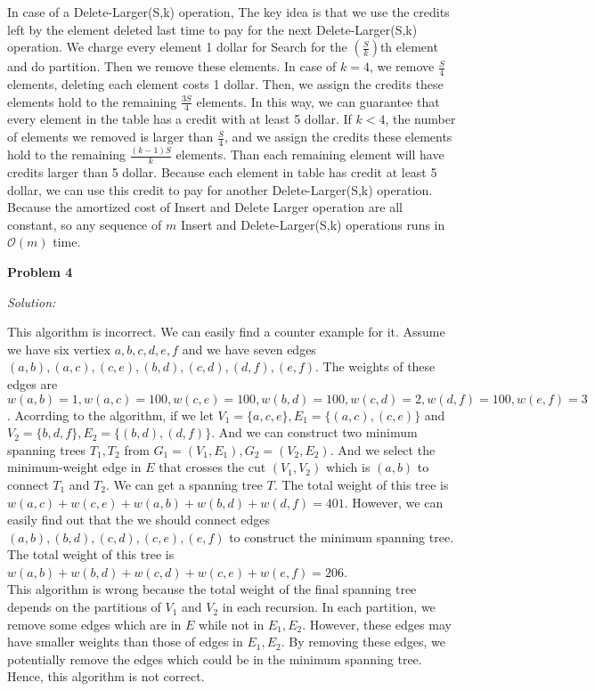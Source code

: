 \documentclass[12pt,letterpaper]{article}
\def\pp{\par\noindent}
\newcommand{\problem}[1]{ \bigskip \pp \textbf{Problem #1}\par}
\newcommand{\solution}{\textit{Solution:}\par}
\begin{document}
In case of a Delete-Larger(S,k) operation, The key idea is that we use the credits left by the element deleted last time to pay for the next Delete-Larger(S,k) operation. We charge every element 1 dollar for Search for the $(\frac{S}{k})$th element and do partition. Then we remove these elements. In case of $k=4$, we remove $\frac{S}{4}$ elements, deleting each element costs 1 dollar. Then, we assign the credits these elements hold to the remaining $\frac{3S}{4}$ elements. In this way, we can guarantee that every element in the table has a credit with at least 5 dollar. If $k < 4$, the number of elements we removed is larger than $\frac{S}{4}$, and we assign the credits these elements hold to the remaining $\frac{(k-1)S}{k}$ elements. Than each remaining element will have credits larger than 5 dollar. Because each element in table has credit at least 5 dollar, we can use this credit to pay for another Delete-Larger(S,k) operation. Because the amortized cost of Insert and Delete Larger operation are all constant, so any sequence of $m$ Insert and Delete-Larger(S,k) operations runs in $\mathcal{O}(m)$ time.

\problem{4}
\solution
This algorithm is incorrect. We can easily find a counter example for it. Assume we have six vertiex $a,b,c,d,e,f$ and we have seven edges $(a,b), (a,c), (c,e), (b,d), (c,d), (d,f), (e,f)$. The weights of these edges are $w(a,b) = 1,w(a,c) = 100, w(c,e) = 100, w(b,d) = 100, w(c,d) = 2, w(d,f) = 100, w(e,f) = 3$. Acorrding to the algorithm, if we let $V_ 1 = \{a, c, e\}, E_1 = \{(a,c), (c,e) \}$ and $V_2 = \{b, d, f\}, E_2 = \{(b,d), (d,f)\}$. And we can construct two minimum spanning trees $T_1, T_2$ from $G_1 = (V_1, E_1), G_2 = (V_2, E_2)$. And we select the minimum-weight edge in $E$ that crosses the cut $(V_1,V_2)$ which is $(a,b)$ to connect $T_1$ and $T_2$.  We can get a spanning tree $T$. The total weight of this tree is $w(a,c) + w(c,e) + w(a,b) + w(b,d) + w(d,f) = 401$. However, we can easily find out that the we should connect edges $(a,b), (b,d), (c,d), (c,e), (e,f)$ to construct the minimum spanning tree. The total weight of this tree is $w(a,b) + w(b,d) + w(c,d) + w(c,e) + w(e,f) = 206$. \\
This algorithm is wrong because the total weight of the final spanning tree depends on the partitions of $V_1$ and $V_2$ in each recursion. In each partition, we remove some edges which are in $E$ while not in $E_1,E_2$. However, these edges may have smaller weights than those of edges in $E_1,E_2$. By removing these edges, we potentially remove the edges which could be in the minimum spanning tree. Hence, this algorithm is not correct. 
\end{document}
